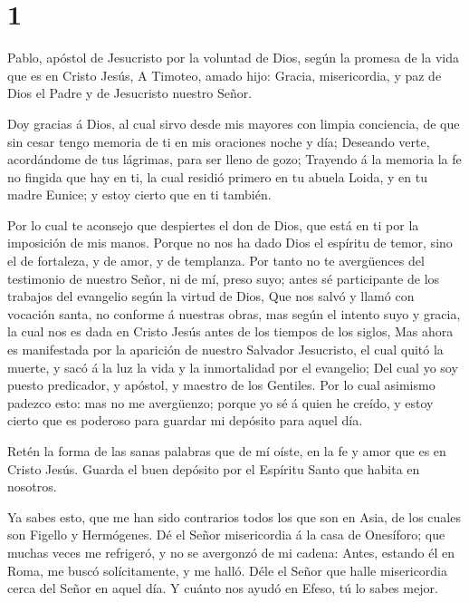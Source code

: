 \hypertarget{section}{%
\section{1}\label{section}}

 Pablo, apóstol de Jesucristo por la voluntad de Dios, según
la promesa de la vida que es en Cristo Jesús,  A Timoteo,
amado hijo: Gracia, misericordia, y paz de Dios el Padre y de Jesucristo
nuestro Señor.

 Doy gracias á Dios, al cual sirvo desde mis mayores con
limpia conciencia, de que sin cesar tengo memoria de ti en mis oraciones
noche y día;  Deseando verte, acordándome de tus lágrimas,
para ser lleno de gozo;  Trayendo á la memoria la fe no
fingida que hay en ti, la cual residió primero en tu abuela Loida, y en
tu madre Eunice; y estoy cierto que en ti también.

 Por lo cual te aconsejo que despiertes el don de Dios, que
está en ti por la imposición de mis manos.  Porque no nos ha
dado Dios el espíritu de temor, sino el de fortaleza, y de amor, y de
templanza.  Por tanto no te avergüences del testimonio de
nuestro Señor, ni de mí, preso suyo; antes sé participante de los
trabajos del evangelio según la virtud de Dios,  Que nos
salvó y llamó con vocación santa, no conforme á nuestras obras, mas
según el intento suyo y gracia, la cual nos es dada en Cristo Jesús
antes de los tiempos de los siglos,  Mas ahora es
manifestada por la aparición de nuestro Salvador Jesucristo, el cual
quitó la muerte, y sacó á la luz la vida y la inmortalidad por el
evangelio;  Del cual yo soy puesto predicador, y apóstol, y
maestro de los Gentiles.  Por lo cual asimismo padezco
esto: mas no me avergüenzo; porque yo sé á quien he creído, y estoy
cierto que es poderoso para guardar mi depósito para aquel día.

 Retén la forma de las sanas palabras que de mí oíste, en
la fe y amor que es en Cristo Jesús.  Guarda el buen
depósito por el Espíritu Santo que habita en nosotros.

 Ya sabes esto, que me han sido contrarios todos los que
son en Asia, de los cuales son Figello y Hermógenes.  Dé el
Señor misericordia á la casa de Onesíforo; que muchas veces me
refrigeró, y no se avergonzó de mi cadena:  Antes, estando
él en Roma, me buscó solícitamente, y me halló.  Déle el
Señor que halle misericordia cerca del Señor en aquel día. Y cuánto nos
ayudó en Efeso, tú lo sabes mejor.

